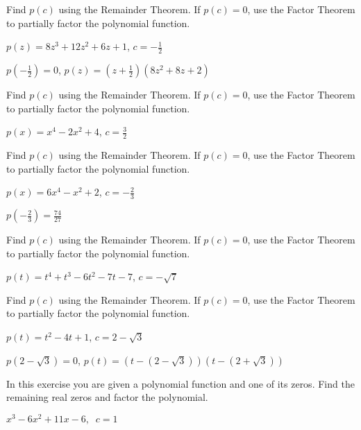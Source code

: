 \documentclass{ximera}
\begin{document}
\begin{problem}
Find $p(c)$ using the Remainder Theorem.  If $p(c) = 0$, use the Factor Theorem to partially factor the polynomial function.

$p(z) = 8z^3+12z^2+6z+1$, $c =-\frac{1}{2}$

\begin{solution}
$p\left(-\frac{1}{2}\right) = 0$, $p(z)  = \left(z+\frac{1}{2}\right)\left(8z^2+8z+2\right)$   
\end{solution}
\end{problem}

\begin{problem}
Find $p(c)$ using the Remainder Theorem.  If $p(c) = 0$, use the Factor Theorem to partially factor the polynomial function.

$p(x) = x^4 - 2x^2+4$, $c=\frac{3}{2}$
\end{problem}

\begin{problem}
Find $p(c)$ using the Remainder Theorem.  If $p(c) = 0$, use the Factor Theorem to partially factor the polynomial function.

$p(x) = 6x^4-x^2+2$, $c =-\frac{2}{3}$

\begin{solution}
$p\left(-\frac{2}{3}\right) = \frac{74}{27}$
\end{solution}
\end{problem}

\begin{problem}
Find $p(c)$ using the Remainder Theorem.  If $p(c) = 0$, use the Factor Theorem to partially factor the polynomial function.

$p(t) = t^4 +t^3-6t^2-7t-7$, $c=-\sqrt{7}$
\end{problem}

\begin{problem}\label{remainderexerlast}
Find $p(c)$ using the Remainder Theorem.  If $p(c) = 0$, use the Factor Theorem to partially factor the polynomial function.

$p(t) = t^2-4t+1$, $c =2-\sqrt{3}$

\begin{solution}
$p(2-\sqrt{3}) =0$, $p(t) = (t-(2-\sqrt{3}))(t-(2+\sqrt{3})) $
\end{solution}
\end{problem}

\begin{problem}\label{factorpolyzerofirst}
In this exercise you are given a polynomial function and one of its zeros.  Find the remaining real zeros and factor the polynomial. 

$x^{3} - 6x^{2} + 11x - 6, \;\; c = 1$ 
\end{problem}
\end{document}
